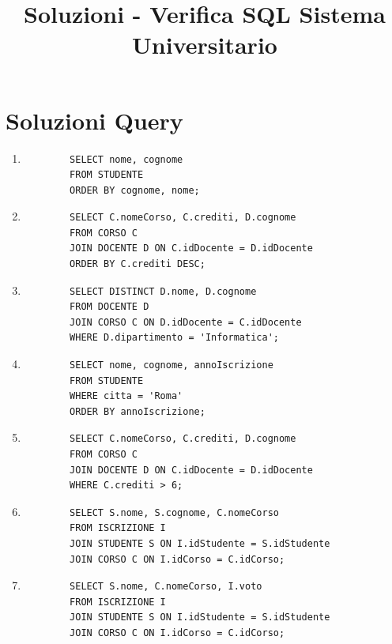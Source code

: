 \documentclass[a4paper,12pt]{article}
\title{Soluzioni - Verifica SQL Sistema Universitario}
\date{}
\begin{document}
\maketitle

\section*{Soluzioni Query}

\begin{enumerate}
	
	\item
	\begin{verbatim}
		SELECT nome, cognome
		FROM STUDENTE
		ORDER BY cognome, nome;
	\end{verbatim}
	
	\item
	\begin{verbatim}
		SELECT C.nomeCorso, C.crediti, D.cognome
		FROM CORSO C
		JOIN DOCENTE D ON C.idDocente = D.idDocente
		ORDER BY C.crediti DESC;
	\end{verbatim}
	
	\item
	\begin{verbatim}
		SELECT DISTINCT D.nome, D.cognome
		FROM DOCENTE D
		JOIN CORSO C ON D.idDocente = C.idDocente
		WHERE D.dipartimento = 'Informatica';
	\end{verbatim}
	
	\item
	\begin{verbatim}
		SELECT nome, cognome, annoIscrizione
		FROM STUDENTE
		WHERE citta = 'Roma'
		ORDER BY annoIscrizione;
	\end{verbatim}
	
	\item
	\begin{verbatim}
		SELECT C.nomeCorso, C.crediti, D.cognome
		FROM CORSO C
		JOIN DOCENTE D ON C.idDocente = D.idDocente
		WHERE C.crediti > 6;
	\end{verbatim}
	
	\item
	\begin{verbatim}
		SELECT S.nome, S.cognome, C.nomeCorso
		FROM ISCRIZIONE I
		JOIN STUDENTE S ON I.idStudente = S.idStudente
		JOIN CORSO C ON I.idCorso = C.idCorso;
	\end{verbatim}
	
	\item
	\begin{verbatim}
		SELECT S.nome, C.nomeCorso, I.voto
		FROM ISCRIZIONE I
		JOIN STUDENTE S ON I.idStudente = S.idStudente
		JOIN CORSO C ON I.idCorso = C.idCorso;
	\end{verbatim}
	

\end{enumerate}
\end{document}

